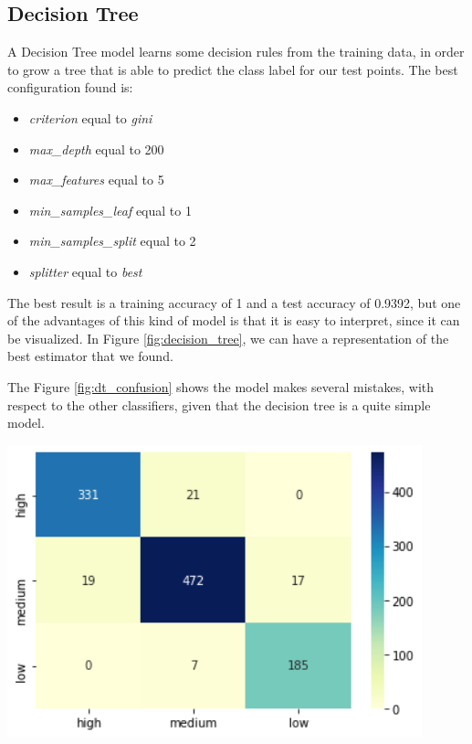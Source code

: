 \subsection{Decision Tree}
\begin{minipage}{0.59\textwidth}
A Decision Tree model learns some decision rules from the training data, in order to grow a tree that is able to predict the class label for our test points. 
The best configuration found is:
\begin{itemize}
\item \emph{criterion} equal to \emph{gini}
\item \emph{max\_depth} equal to 200
\item \emph{max\_features} equal to 5
\item \emph{min\_samples\_leaf} equal to 1
\item \emph{min\_samples\_split} equal to 2
\item \emph{splitter} equal to \emph{best}
\end{itemize}

The best result is a training accuracy of 1 and a test accuracy of 0.9392, but one of the advantages of this kind of model is that it is easy to interpret, since it can be visualized.
In Figure \ref{fig:decision_tree}, we can have a representation of the best estimator that we found.

The Figure \ref{fig:dt_confusion} shows the model makes several mistakes, with respect to the other classifiers, given that the decision tree is a quite simple model.
\end{minipage}
\begin{minipage}{0.4\textwidth}
\centering
\includegraphics[width=0.90\textwidth]{img/classification/dt_confusion.png}
\captionsetup{justification=centering}
\label{fig:dt_confusion}
\end{minipage}

